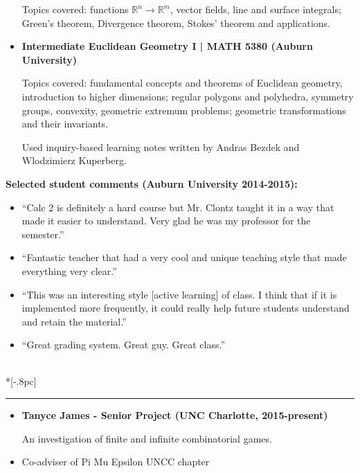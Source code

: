 \documentclass{article}
\newcommand{\headerText}[1]{
  \noindent{\large \bf #1} \\*[-.8pc]
  \rule{\textwidth}{.1pt}}
\begin{document}
\begin{itemize}
    Topics covered: functions \(\mathbb R^n\to\mathbb R^m\), vector fields,
    line and surface integrals; Green's theorem, Divergence theorem,
    Stokes' theorem and applications.

  \item
    \textbf{Intermediate Euclidean Geometry I | MATH 5380 (Auburn University)}

    Topics covered: fundamental concepts and theorems of Euclidean geometry,
    introduction to higher dimensions; regular polygons and polyhedra,
    symmetry groups, convexity, geometric extremum problems; geometric
    transformations and their invariants.

    Used inquiry-based learning notes written by Andras Bezdek and
    Wlodzimierz Kuperberg.
\end{itemize}

\noindent
\textbf{Selected student comments (Auburn University 2014-2015):}
    \begin{itemize}
      \item ``Calc 2 is definitely a hard course but Mr. Clontz taught it in a way that made it easier to understand. Very glad he was my professor for the semester.''
      \item ``Fantastic teacher that had a very cool and unique teaching style that made everything very clear.''
      \item ``This was an interesting style [active learning] of class. I think that if it is implemented more frequently, it could really help future students understand and retain the material.''
      \item ``Great grading system. Great guy. Great class.''
    \end{itemize}



\vfill


\headerText{Mentorship/Advising}
\begin{itemize}
  \item
    \textbf{Tanyce James - Senior Project (UNC Charlotte, 2015-present)}

    An investigation of finite and infinite combinatorial games.
  \item
    Co-adviser of Pi Mu Epsilon UNCC chapter
\end{itemize}


\vfill
\newpage
\end{document}
